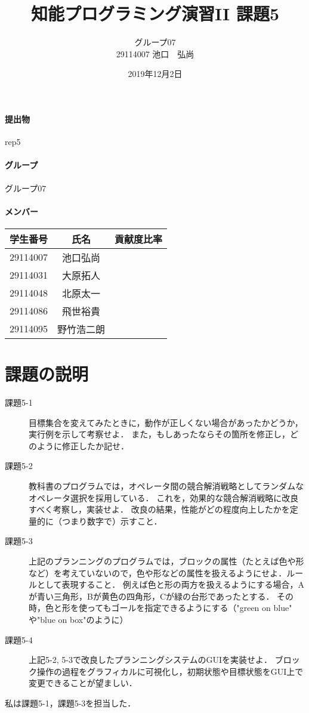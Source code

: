 \documentclass{jarticle}
\title{知能プログラミング演習II 課題5}
\author{グループ07\\
  29114007 池口　弘尚\\
}
\date{2019年12月2日}
\begin{document}
\maketitle

\paragraph{提出物} rep5
\paragraph{グループ} グループ07
\paragraph{メンバー}
\begin{tabular}{|c|c|c|}
  \hline
  学生番号&氏名&貢献度比率\\
  \hline\hline
  29114007&池口弘尚&\\
  \hline
  29114031&大原拓人&\\
  \hline
  29114048&北原太一&\\
  \hline
  29114086&飛世裕貴&\\
  \hline
  29114095&野竹浩二朗&\\
\end{tabular}

\section{課題の説明}
\begin{description}
\item[課題5-1] 目標集合を変えてみたときに，動作が正しくない場合があったかどうか，実行例を示して考察せよ．
また，もしあったならその箇所を修正し，どのように修正したか記せ．
\item[課題5-2] 教科書のプログラムでは，オペレータ間の競合解消戦略としてランダムなオペレータ選択を採用している．
これを，効果的な競合解消戦略に改良すべく考察し，実装せよ．
改良の結果，性能がどの程度向上したかを定量的に（つまり数字で）示すこと．
\item[課題5-3] 上記のプランニングのプログラムでは，ブロックの属性（たとえば色や形など）を考えていないので，色や形などの属性を扱えるようにせよ．ルールとして表現すること．
例えば色と形の両方を扱えるようにする場合，Aが青い三角形，Bが黄色の四角形，Cが緑の台形であったとする．
その時，色と形を使ってもゴールを指定できるようにする（"green on blue" や"blue on box"のように）
\item[課題5-4]上記5-2, 5-3で改良したプランニングシステムのGUIを実装せよ．
ブロック操作の過程をグラフィカルに可視化し，初期状態や目標状態をGUI上で変更できることが望ましい．
\end{description}
私は課題5-1，課題5-3を担当した．
\end{document}
